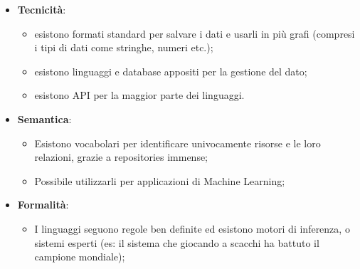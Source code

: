 \begin{itemize}
	\item \textbf{Tecnicità}:
	\begin{itemize}
		\item esistono formati standard per salvare i dati e usarli in più grafi (compresi i tipi di dati come stringhe, numeri etc.);
		\item esistono linguaggi e database appositi per la gestione del dato;
		\item esistono API per la maggior parte dei linguaggi.
	\end{itemize}
	\item \textbf{Semantica}:
	\begin{itemize}
		\item Esistono vocabolari per identificare univocamente risorse e le loro relazioni, grazie a repositories immense;
		\item Possibile utilizzarli per applicazioni di Machine Learning;
	\end{itemize}
	\item \textbf{Formalità}:
	\begin{itemize}
		\item I linguaggi seguono regole ben definite ed esistono motori di inferenza, o sistemi esperti (es: il sistema che giocando a scacchi ha battuto il campione mondiale);
	\end{itemize}
\end{itemize}
\newpage
